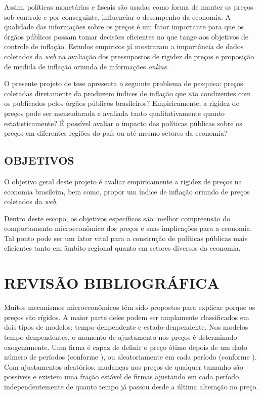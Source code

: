 \documentclass[twoside,a4paper,11pt]{report}
\begin{document}
Assim, políticas monetárias e fiscais são usadas como forma de manter os preços sob controle e por conseguinte, influenciar o desempenho da economia. A qualidade das informações sobre os preços é um fator importante para que os órgãos públicos possam tomar decisões eficientes no que tange aos objetivos de controle de inflação. Estudos empiricos já mostraram a importância de dados coletados da \emph{web} na avaliação dos pressupostos de rigidez de preços e proposição de medida de inflação oriunda de informações \emph{online}.

O presente projeto de tese apresenta o seguinte problema de pesquisa: preços coletadas diretamente da  produzem índices de inflação que são condizentes com os publicados pelos órgãos públicos brasileiros? Empiricamente, a rigidez de preços pode ser mensudarada e avaliada tanto qualitativamente quanto estatisticamente? É possível avaliar o impacto das políticas públicas sobre os preços em diferentes regiões do país ou até mesmo setores da economia?


\section*{OBJETIVOS}

O objetivo geral deste projeto é avaliar empiricamente a rigidez de preços na economia brasileira, bem como, propor um índice de inflação oriundo de preços coletados da \emph{web}.

Dentro deste escopo, os objetivos específicos são: melhor compreensão do comportamento microeconômico dos preços e suas implicações para a economia. Tal ponto pode ser um fator vital para a construção de políticas públicas mais eficientes tanto em âmbito regional quanto em setores diversos da economia.  
\pagestyle{empty}
\cleardoublepage
\pagestyle{fancy}

\chapter{REVISÃO BIBLIOGRÁFICA}\label{cap2}

Muitos mecanismos microeconômicos têm sido propostos para explicar porque os preços são rígidos. A maior parte deles podem ser amplamente classificados em dois tipos de modelos: tempo-denpendente e estado-denpendente. Nos modelos tempo-denpendentes, o momento de ajustamento nos preços é determinado exogenamente. Uma firma é capaz de definir o preço ótimo depois de um dado número de períodos (conforme \citet{taylor1980aggregate}), ou aleatoriamente em cada período (conforme \citet{calvo1983staggered}). Com ajustamentos aleatórios, mudanças nos preços de qualquer tamanho são possíveis e existem uma fração estável de firmas ajustando em cada período, independentemente de quanto tempo já passou desde a última alteração no preço. 
\end{document}
